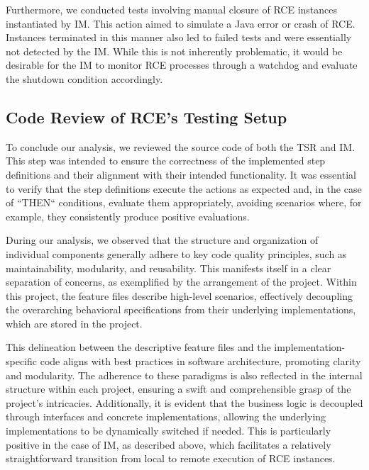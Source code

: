 Furthermore, we conducted tests involving manual closure of \ac{RCE} instances instantiated by \ac{IM}. This action aimed to simulate a Java error or crash of \ac{RCE}. Instances terminated in this manner also led to failed tests and were essentially not detected by the \ac{IM}. While this is not inherently problematic, it would be desirable for the \ac{IM} to monitor \ac{RCE} processes through a watchdog and evaluate the shutdown condition accordingly.

\subsection{Code Review of \ac{RCE}'s Testing Setup}
\label{subsec:CodeReview}
To conclude our analysis, we reviewed the source code of both the \ac{TSR} and \ac{IM}. This step was intended to ensure the correctness of the implemented step definitions and their alignment with their intended functionality. It was essential to verify that the step definitions execute the actions as expected and, in the case of ``THEN`` conditions, evaluate them appropriately, avoiding scenarios where, for example, they consistently produce positive evaluations.

During our analysis, we observed that the structure and organization of individual components generally adhere to key code quality principles, such as maintainability, modularity, and reusability. This manifests itself in a clear separation of concerns, as exemplified by the arrangement of the \texttt{} project. Within this project, the feature files describe high-level scenarios, effectively decoupling the overarching behavioral specifications from their underlying implementations, which are stored in the \texttt{} project. 

This delineation between the descriptive feature files and the implementation-specific code aligns with best practices in software architecture, promoting clarity and modularity. The adherence to these paradigms is also reflected in the internal structure within each project, ensuring a swift and comprehensible grasp of the project's intricacies. Additionally, it is evident that the business logic is decoupled through interfaces and concrete implementations, allowing the underlying implementations to be dynamically switched if needed. This is particularly positive in the case of \ac{IM}, as described above, which facilitates a relatively straightforward transition from local to remote execution of \ac{RCE} instances. 

